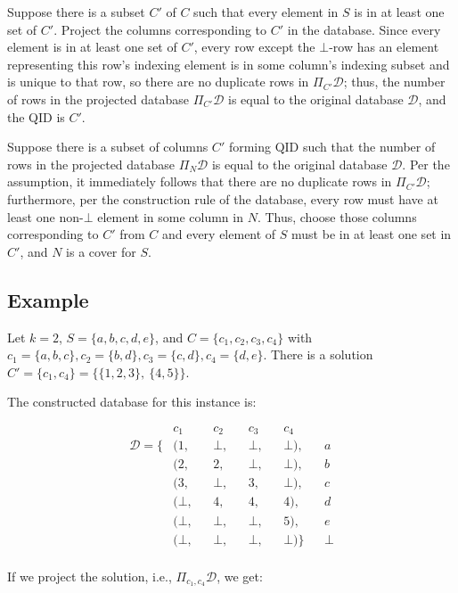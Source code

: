 \documentclass[12pt]{llncs}
\newcommand{\cD}{\mathcal{D}}
\newcommand{\Proj}[1]{\Pi_{#1}}
\begin{document}
Suppose there is a subset $C'$ of $C$ such that every element in $S$ is in at least one set of $C'$. Project the columns corresponding to $C'$ in the database. Since every element is in at least one set of $C'$, every row except the $\bot$-row has an element representing this row's indexing element is in some column's indexing subset and is unique to that row, so there are no duplicate rows in $\Proj{C'} \cD$; thus, the number of rows in the projected database $\Proj{C'} \cD$ is equal to the original database $\cD$, and the QID is $C'$.

Suppose there is a subset of columns $C'$ forming QID such that the number of rows in the projected database $\Proj{N} \cD$ is equal to the original database $\cD$. Per the assumption, it immediately follows that there are no duplicate rows in $\Proj{C'} \cD$; furthermore, per the construction rule of the database, every row must have at least one non-$\bot$ element in some column in $N$. Thus, choose those columns corresponding to $C'$ from $C$ and every element of $S$ must be in at least one set in $C'$, and $N$ is a cover for $S$.

\subsection{Example}
Let $k=2$, $S = \{a,b,c,d,e\}$, and $C = \{c_1,c_2,c_3,c_4\}$ with $c_1 = \{a,b,c\}, c_2 = \{b,d\}, c_3 = \{c,d\}, c_4 = \{d,e\}$. There is a solution $C' = \{c_1,c_4\} = \{\{1,2,3\},~\{4,5\}\}$.

The constructed database for this instance is:

\begin{align*}
                 &  c_1   && c_2   && c_3   && c_4     &&\\
\mathcal{D} = \{ & (1,    && \bot, && \bot, && \bot),  && a\\
                 & (2,    && 2,    && \bot, && \bot),  && b\\
                 & (3,    && \bot, && 3,    && \bot),  && c\\
                 & (\bot, && 4,    && 4,    && 4   ),  && d\\
                 & (\bot, && \bot, && \bot, && 5   ),  && e\\
                 & (\bot, && \bot, && \bot, && \bot)\} && \bot\\
\end{align*}

If we project the solution, i.e., $\Proj{c_1,c_4} \mathcal{D}$, we get:
\end{document}
